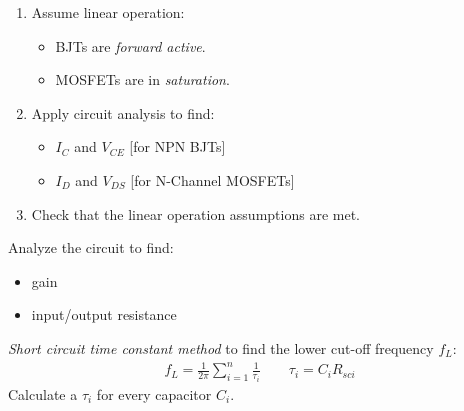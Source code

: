 \begin{CheatsheetEntryFrame}
    \bigskip
    \SoftHLine

    \begin{MulticolsSoftSepRule}{2}

        \begin{enumerate}
            \item Assume linear operation:
            \begin{itemize}
                \item BJTs are \emph{forward active}.
                \item MOSFETs are in \emph{saturation}.
            \end{itemize}
            \item Apply circuit analysis to find:
            \begin{itemize}
                \item $I_C$ and $V_{CE}$ {\footnotesize {}[for NPN BJTs]}
                \item $I_D$ and $V_{DS}$ {\footnotesize {}[for N-Channel MOSFETs]}
            \end{itemize}
            \item Check that the linear operation assumptions are met.
        \end{enumerate}

        \bigskip
        \SoftHLine
        \bigskip


        Analyze the circuit to find:
        \begin{itemize}
            \item gain
            \item input/output resistance
        \end{itemize}

        \MulticolsBreak


        \emph{Short circuit time constant method} to find the \linebreak lower cut-off frequency $f_L$:
        \begin{gather*}
            f_L
            = \frac{1}{2 \pi}
            \sum_{i=1}^n \frac{1}{\tau_i}
            \qquad
            \tau_i = C_i R_{sci}
        \end{gather*}
        Calculate a $\tau_i$ for every capacitor $C_i$.


\end{MulticolsSoftSepRule}
\end{CheatsheetEntryFrame}
